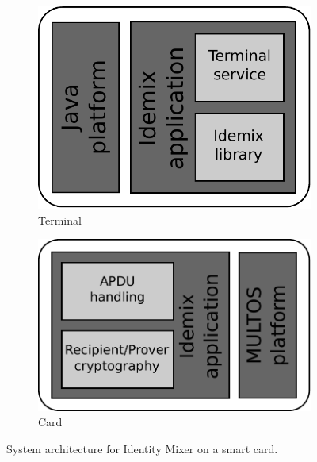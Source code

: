 \begin{figure}[ht]
  \centering
  \begin{subfigure}{0.45\textwidth}
    \includegraphics[scale=.45]{images/idemix-terminal-architecture}
    \caption{Terminal}
    \label{fig:terminal-architecture}
  \end{subfigure}
  \qquad
  \begin{subfigure}{0.45\textwidth}
    \includegraphics[scale=.45]{images/idemix-card-architecture}
    \caption{Card}
    \label{fig:card-architecture}
  \end{subfigure}
  \caption{System architecture for Identity Mixer on a smart card.}
  \label{fig:architecture}
\end{figure}

